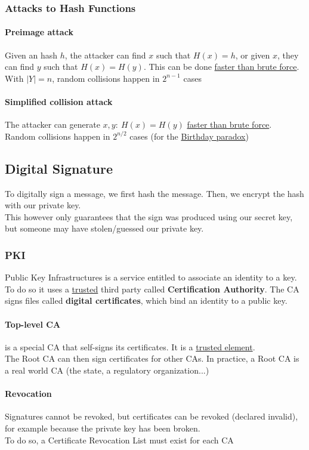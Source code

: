 \documentclass{article}
\begin{document}
\subsubsection{Attacks to Hash Functions}
\paragraph{Preimage attack} Given an hash $h$, the attacker can find $x$ such that $H(x)=h$, or given $x$, they can find $y$ such that $H(x)=H(y)$. This can be done \underline{faster than brute force}.\\
With $|Y|=n$, random collisions happen in $2^{n-1}$ cases
\paragraph{Simplified collision attack} The attacker can generate $x,y:\:H(x)=H(y)$ \underline{faster than brute force}.\\
Random collisions happen in $2^{n/2}$ cases (for the \href{https://en.wikipedia.org/wiki/Birthday_problem}{Birthday paradox}) 


\subsection{Digital Signature}
To digitally sign a message, we first hash the message. Then, we encrypt the hash with our private key.\\
This however only guarantees that the sign was produced using our secret key, but someone may have stolen/guessed our private key.
\subsubsection{PKI} Public Key Infrastructures is a service entitled to associate an identity to a key.\\
To do so it uses a \underline{trusted} third party called \textbf{Certification Authority}. The CA signs files called \textbf{digital certificates}, which bind an identity  to a public key.
\paragraph{Top-level CA} is a special CA that self-signs its certificates. It is a \underline{trusted element}.\\
The Root CA can then sign certificates for other CAs. In practice, a Root CA is a real  world CA (the state, a regulatory organization...)
\paragraph{Revocation} Signatures cannot be revoked, but certificates can be revoked  (declared invalid), for example because the private key has been broken.\\
To do so, a Certificate Revocation List must exist for each CA
\end{document}

